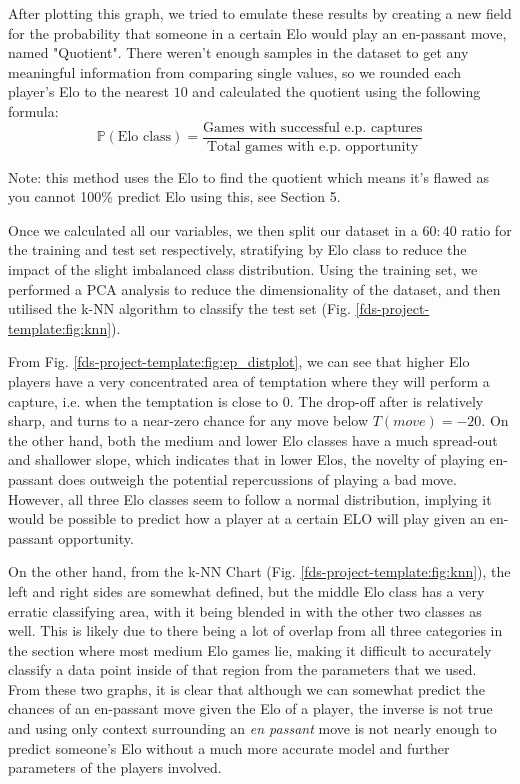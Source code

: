\documentclass[10pt,a4paper]{article}
\begin{document}
\begin{multicols}{2}
After plotting this graph, we tried to emulate these results by creating a new field for the probability that someone in a certain Elo would play an en-passant move, named "Quotient". There weren't enough samples in the dataset to get any meaningful information from comparing single values, so we rounded each player's Elo to the nearest $10$ and calculated the quotient using the following formula:
$$\mathbb{P}(\text{Elo class}) = \frac{\text{Games with successful e.p. captures}}{\text{Total games with e.p. opportunity}}$$

Note: this method uses the Elo to find the quotient which means it's flawed as you cannot 100\% predict Elo using this, see Section 5. \newline

Once we calculated all our variables, we then split our dataset in a $60:40$ ratio for the training and test set respectively, stratifying by Elo class to reduce the impact of the slight imbalanced class distribution. Using the training set, we performed a PCA analysis to reduce the dimensionality of the dataset, and then utilised the k-NN algorithm to classify the test set (Fig. \ref{fds-project-template:fig:knn}).\newline

From Fig. \ref{fds-project-template:fig:ep_distplot}, we can see that higher Elo players have a very concentrated area of temptation where they will perform a capture, i.e. when the temptation is close to $0$. The drop-off after is relatively sharp, and turns to a near-zero chance for any move below $T(move)=-20$. On the other hand, both the medium and lower Elo classes have a much spread-out and shallower slope, which indicates that in lower Elos, the novelty of playing en-passant does outweigh the potential repercussions of playing a bad move. However, all three Elo classes seem to follow a normal distribution, implying it would be possible to predict how a player at a certain ELO will play given an en-passant opportunity.\newline

On the other hand, from the k-NN Chart (Fig. \ref{fds-project-template:fig:knn}), the left and right sides are somewhat defined, but the middle Elo class has a very erratic classifying area, with it being blended in with the other two classes as well. This is likely due to there being a lot of overlap from all three categories in the section where most medium Elo games lie, making it difficult to accurately classify a data point inside of that region from the parameters that we used. From these two graphs, it is clear that although we can somewhat predict the chances of an en-passant move given the Elo of a player, the inverse is not true and using only context surrounding an \textit{en passant} move is not nearly enough to predict someone's Elo without a much more accurate model and further parameters of the players involved. \newline


\end{multicols}
\end{document}
